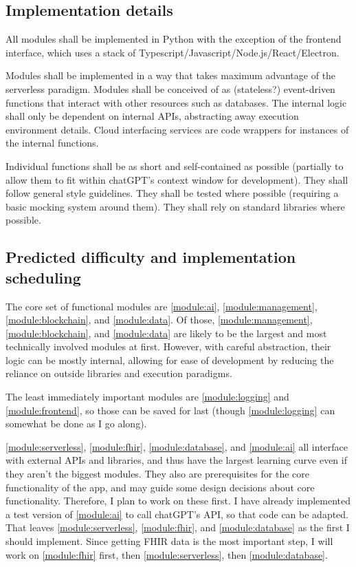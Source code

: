 \documentclass[12pt]{article}
\begin{document}
\subsection{Implementation details}
All modules shall be implemented in Python with the exception of the frontend interface, which uses a stack of Typescript/Javascript/Node.js/React/Electron. 

Modules shall be implemented in a way that takes maximum advantage of the serverless paradigm. Modules shall be conceived of as (stateless?) event-driven functions that interact with other resources such as databases. The internal logic shall only be dependent on internal APIs, abstracting away execution environment details. Cloud interfacing services are code wrappers for instances of the internal functions.

Individual functions shall be as short and self-contained as possible (partially to allow them to fit within chatGPT's context window for development). They shall follow general style guidelines. They shall be tested where possible (requiring a basic mocking system around them). They shall rely on standard libraries where possible.

\subsection{Predicted difficulty and implementation scheduling}

The core set of functional modules are \ref{module:ai}, \ref{module:management}, \ref{module:blockchain}, and \ref{module:data}. Of those, \ref{module:management}, \ref{module:blockchain}, and \ref{module:data} are likely to be the largest and most technically involved modules at first. However, with careful abstraction, their logic can be mostly internal, allowing for ease of development by reducing the reliance on outside libraries and execution paradigms.

The least immediately important modules are \ref{module:logging} and \ref{module:frontend}, so those can be saved for last (though \ref{module:logging} can somewhat be done as I go along).

\ref{module:serverless}, \ref{module:fhir}, \ref{module:database}, and \ref{module:ai} all interface with external APIs and libraries, and thus have the largest learning curve even if they aren't the biggest modules. They also are prerequisites for the core functionality of the app, and may guide some design decisions about core functionality. Therefore, I plan to work on these first. I have already implemented a test version of \ref{module:ai} to call chatGPT's API, so that code can be adapted. That leaves \ref{module:serverless}, \ref{module:fhir}, and \ref{module:database} as the first I should implement. Since getting FHIR data is the most important step, I will work on \ref{module:fhir} first, then \ref{module:serverless}, then \ref{module:database}.
\end{document}
